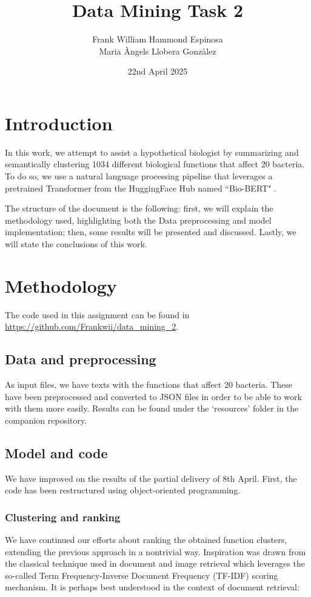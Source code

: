\documentclass{article}
\title{Data Mining Task 2}
\author{Frank William Hammond Espinosa
\\
Maria Àngels Llobera Gonzàlez}
\date{22nd April 2025}
\begin{document}
\maketitle
\section{Introduction}
In this work, we attempt to assist a hypothetical biologist by summarizing and semantically clustering 1034 different biological functions that affect 20 bacteria. To do so, we use a natural language processing pipeline that leverages a pretrained Transformer from the HuggingFace Hub named ``Bio-BERT" \cite{Lee_2019}.

The structure of the document is the following: first, we will explain the methodology used, highlighting both the Data preprocessing and model implementation; then, some results will be presented and discussed. Lastly, we will state the conclusions of this work.

\section{Methodology}
The code used in this assignment can be found in \href{https://github.com/Frankwii/data_mining_2}{https://github.com/Frankwii/data\_mining\_2}.
\subsection{Data and preprocessing}
As input files, we have texts with the functions that affect 20 bacteria. These have been preprocessed and converted to JSON files in order to be able to work with them more easily. Results can be found under the `resources' folder in the companion repository.

\subsection{Model and code}

We have improved on the results of the partial delivery of 8th April. First, the code has been restructured using object-oriented programming.

\subsubsection{Clustering and ranking}

We have continued our efforts about ranking the obtained function clusters, extending the previous approach in a nontrivial way. Inspiration was drawn from the classical technique used in document and image retrieval which leverages the so-called Term Frequency-Inverse Document Frequency (TF-IDF) scoring mechanism. It is perhaps best understood in the context of document retrieval:
\end{document}
